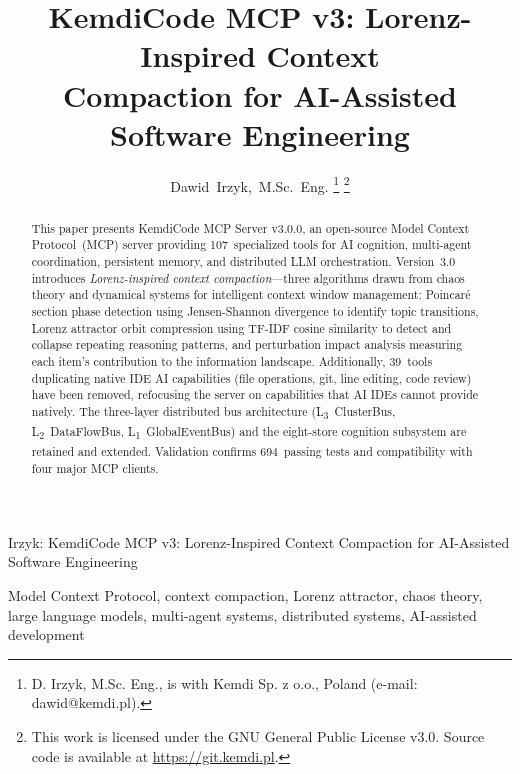 \documentclass[journal,10pt]{IEEEtran}
\newcommand{\layerthree}{L\textsubscript{3}}
\newcommand{\layertwo}{L\textsubscript{2}}
\newcommand{\layerone}{L\textsubscript{1}}
\begin{document}
\title{KemdiCode MCP v3: Lorenz-Inspired Context\\Compaction for AI-Assisted Software Engineering}

\author{Dawid~Irzyk,~M.Sc.~Eng.%
\thanks{D. Irzyk, M.Sc. Eng., is with Kemdi Sp. z o.o., Poland (e-mail: dawid@kemdi.pl).}%
\thanks{This work is licensed under the GNU General Public License v3.0. Source code is available at \url{https://git.kemdi.pl}.}}

%
{Irzyk: KemdiCode MCP v3: Lorenz-Inspired Context Compaction for AI-Assisted Software Engineering}

\maketitle

\begin{abstract}
This paper presents KemdiCode MCP Server v3.0.0, an open-source Model Context Protocol~(MCP) server providing 107~specialized tools for AI cognition, multi-agent coordination, persistent memory, and distributed LLM orchestration. Version~3.0 introduces \emph{Lorenz-inspired context compaction}---three algorithms drawn from chaos theory and dynamical systems for intelligent context window management: Poincar\'{e} section phase detection using Jensen-Shannon divergence to identify topic transitions, Lorenz attractor orbit compression using TF-IDF cosine similarity to detect and collapse repeating reasoning patterns, and perturbation impact analysis measuring each item's contribution to the information landscape. Additionally, 39~tools duplicating native IDE AI capabilities (file operations, git, line editing, code review) have been removed, refocusing the server on capabilities that AI IDEs cannot provide natively. The three-layer distributed bus architecture (\layerthree~ClusterBus, \layertwo~DataFlowBus, \layerone~GlobalEventBus) and the eight-store cognition subsystem are retained and extended. Validation confirms 694~passing tests and compatibility with four major MCP clients.
\end{abstract}

\begin{IEEEkeywords}
Model Context Protocol, context compaction, Lorenz attractor, chaos theory, large language models, multi-agent systems, distributed systems, AI-assisted development
\end{IEEEkeywords}
\end{document}
